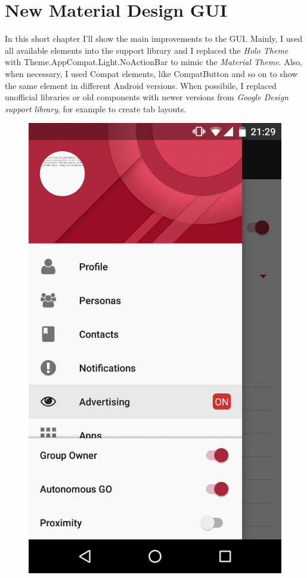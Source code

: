 \chapter{New Material Design GUI}
\label{gui}

In this short chapter I'll show the main improvements to the GUI.
Mainly, I used all available elements into the support library and I replaced the \emph{Holo Theme} with \textsf{Theme.AppCompat.Light.NoActionBar} to mimic the \emph{Material Theme}. Also, when necessary, I used \textsf{Compat} elements, like \textsf{CompatButton} and so on to show the same element in different Android versions. When possibile, I replaced unofficial libraries or old components with newer versions from \emph{Google Design support library}, for example to create tab layouts. 

\begin{figure}[thpb]
\centering
\begin{minipage}[b]{0.4\textwidth}
	\centering
	\includegraphics[scale=0.1]{./images/chap3/drawer.png}

\end{minipage}
\end{figure}

